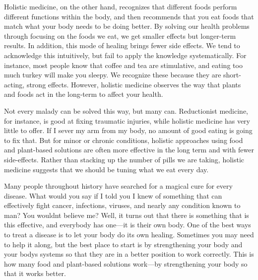 \documentclass[letterpaper]{article}
\begin{document}
{\color{black}
Holistic medicine, on the other hand, recognizes that different foods
perform different functions within the body, and then recommends that
you eat foods that match what your body needs to be doing better. By
solving our health problems
\textcolor[rgb]{0.32941177,0.5529412,0.83137256}{through} focusing on
the foods we eat, we get smaller effects but longer-term results. In
addition, this mode of healing brings fewer side effects.  We tend to
acknowledge this intuitively, but fail to apply the knowledge
systematically.  For instance, most people know that coffee and tea are
stimulative, and eating too much turkey will make you sleepy.  We
recognize these because they are short-acting, strong effects. 
However, holistic medicine observes the way that plants and foods act
in the long-term to affect your health.}

{\color{black}
Not every malady can be solved this way, but many can. Reductionist
medicine, for instance, is good at fixing traumatic injuries, while
holistic medicine has very little to offer. If I sever my arm from my
body, no amount of good eating is going to fix that. But for minor or
chronic conditions, holistic approaches using food and plant-based
solutions are often more effective in the long term
\textcolor[rgb]{0.32941177,0.5529412,0.83137256}{and} with fewer
side-effects.  Rather than stacking up the number of pills we are
taking, holistic medicine suggests that we should be tuning what we eat
every day.}

{\color{black}
Many people throughout history have searched for a magical cure for
every disease. What would you say if I told you I knew of something
that \textcolor[rgb]{0.32941177,0.5529412,0.83137256}{can effectively
fight} cancer, infections, viruses, and nearly any condition
\textcolor[rgb]{0.32941177,0.5529412,0.83137256}{known to man}?  You
wouldn{\textquotesingle}t believe me?  Well, it turns out that there is
something that is this effective, and everybody has one—it is their own
body.\textcolor[rgb]{0.32941177,0.5529412,0.83137256}{ }One of the best
ways \textcolor[rgb]{0.32941177,0.5529412,0.83137256}{to treat a
disease is to} \textcolor[rgb]{0.32941177,0.5529412,0.83137256}{let}
your body do its own healing. Sometimes you may need to help it along,
but the best place to start is by strengthening your body and your
body{\textquotesingle}s systems so that they are in a better position
to work correctly. This is how many food and plant-based solutions
work—by strengthening your body so that it works better.}
\end{document}
